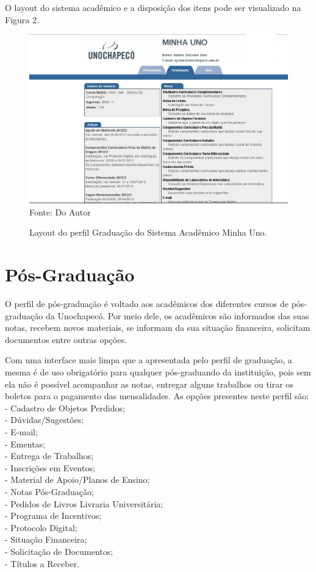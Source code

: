 O layout do sistema acadêmico e a disposição dos itens pode ser visualizado na Figura 2.

\begin{figure}[!htb]
     \centering
     \caption[Layout do Sistema - Perfil Graduação]{Layout do perfil Graduação do Sistema Acadêmico Minha Uno.}
     \includegraphics[scale=0.3]{imagens/GraduacaoCorrigida.png}
     \\ Fonte: Do Autor
\end{figure}

\newpage
\section{Pós-Graduação}
O perfil de pós-graduação é voltado aos acadêmicos dos diferentes cursos de pós-graduação da Unochapecó. 
Por meio dele, os acadêmicos são informados das  suas notas, recebem novos materiais, 
se informam da sua situação financeira, solicitam documentos entre outras opções.

Com uma interface mais limpa que a apresentada pelo perfil de graduação, a mesma é de uso obrigatório para qualquer 
pós-graduando da instituição, pois sem ela não é possível acompanhar as notas, entregar alguns trabalhos ou 
tirar os boletos para o pagamento das mensalidades. As opções presentes neste perfil são: \\
- Cadastro de Objetos Perdidos; \\
- Dúvidas/Sugestões; \\
- E-mail; \\
- Ementas; \\
- Entrega de Trabalhos; \\
- Inscrições em Eventos; \\
- Material de Apoio/Planos de Ensino; \\
- Notas Pós-Graduação; \\
- Pedidos de Livros Livraria Universitária; \\
- Programa de Incentivos; \\
- Protocolo Digital; \\
- Situação Financeira; \\
- Solicitação de Documentos; \\
- Títulos a Receber. \\

